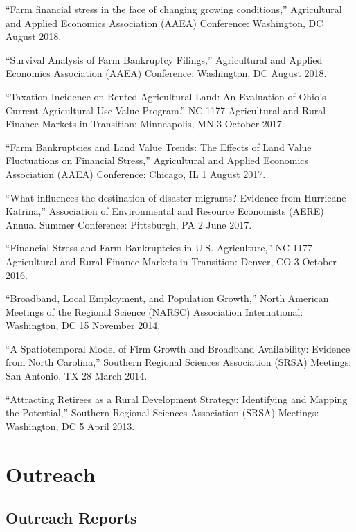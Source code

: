 \documentclass[letterpaper]{article}
\renewenvironment{itemize}{
  \begin{list}{}{
    \setlength{\leftmargin}{1.5em}
  }
}{
  \end{list}
}
\begin{document}
\begin{itemize}
\item ``Farm financial stress in the face of changing growing conditions,'' Agricultural and Applied Economics Association (AAEA) Conference: Washington, DC August 2018.
\item ``Survival Analysis of Farm Bankruptcy Filings,'' Agricultural and Applied Economics Association (AAEA) Conference: Washington, DC August 2018.
\item ``Taxation Incidence on Rented Agricultural Land: An Evaluation of Ohio's Current Agricultural Use Value Program.'' NC-1177 Agricultural and Rural Finance Markets in Transition: Minneapolis, MN 3 October 2017.
\item ``Farm Bankruptcies and Land Value Trends: The Effects of Land Value Fluctuations on Financial Stress,'' Agricultural and Applied Economics Association (AAEA) Conference: Chicago, IL 1 August 2017.
\item ``What influences the destination of disaster migrants? Evidence from Hurricane Katrina,'' Association of Environmental and Resource Economists (AERE) Annual Summer Conference: Pittsburgh, PA 2 June 2017.
\item ``Financial Stress and Farm Bankruptcies in U.S. Agriculture,'' NC-1177 Agricultural and Rural Finance Markets in Transition: Denver, CO 3 October 2016.
\item ``Broadband, Local Employment, and Population Growth,'' North American Meetings of the Regional Science (NARSC) Association International: Washington, DC 15 November 2014.
\item ``A Spatiotemporal Model of Firm Growth and Broadband Availability: Evidence from North Carolina,'' Southern Regional Sciences Association (SRSA) Meetings: San Antonio, TX 28 March 2014.
\item ``Attracting Retirees as a Rural Development Strategy: Identifying and Mapping the Potential,'' Southern Regional Sciences Association (SRSA) Meetings: Washington, DC 5 April 2013.
\end{itemize}

\section*{Outreach}

\subsection*{Outreach Reports}
\end{document}
